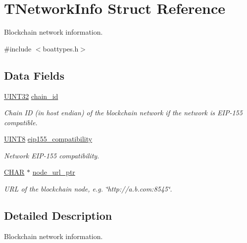 \hypertarget{struct_t_network_info}{}\section{T\+Network\+Info Struct Reference}
\label{struct_t_network_info}


Blockchain network information.  




{\ttfamily \#include $<$boattypes.\+h$>$}

\subsection*{Data Fields}
\begin{DoxyCompactItemize}
\item 
\mbox{\hyperlink{boattypes_8h_ae1e6edbbc26d6fbc71a90190d0266018}{U\+I\+N\+T32}} \mbox{\hyperlink{struct_t_network_info_a01b042ef5fc9d24a77755f82ac8a75eb}{chain\+\_\+id}}
\begin{DoxyCompactList}\small\item\em Chain ID (in host endian) of the blockchain network if the network is E\+I\+P-\/155 compatible. \end{DoxyCompactList}\item 
\mbox{\hyperlink{boattypes_8h_ab27e9918b538ce9d8ca692479b375b6a}{U\+I\+N\+T8}} \mbox{\hyperlink{struct_t_network_info_acc303011417574fe14d58783e3a36348}{eip155\+\_\+compatibility}}
\begin{DoxyCompactList}\small\item\em Network E\+I\+P-\/155 compatibility. \end{DoxyCompactList}\item 
\mbox{\hyperlink{boattypes_8h_aebb9e13210d88d43e32e735ada43a425}{C\+H\+AR}} $\ast$ \mbox{\hyperlink{struct_t_network_info_af9c1bd4a0bd9c92244377526eb17a176}{node\+\_\+url\+\_\+ptr}}
\begin{DoxyCompactList}\small\item\em U\+RL of the blockchain node, e.\+g. \char`\"{}http\+://a.\+b.\+com\+:8545\char`\"{}. \end{DoxyCompactList}\end{DoxyCompactItemize}


\subsection{Detailed Description}
Blockchain network information. 

